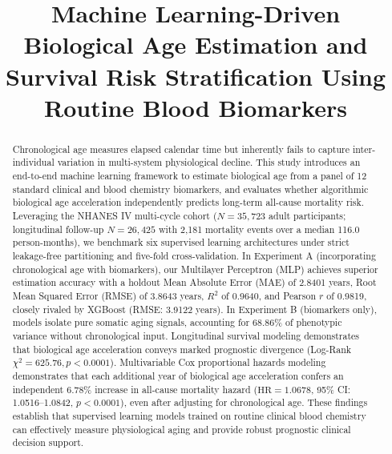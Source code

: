 \documentclass[conference]{IEEEtran}
\begin{document}
\title{Machine Learning-Driven Biological Age Estimation and Survival Risk Stratification Using Routine Blood Biomarkers}

\author{
}

\maketitle

\begin{abstract}
Chronological age measures elapsed calendar time but inherently fails to capture inter-individual variation in multi-system physiological decline. This study introduces an end-to-end machine learning framework to estimate biological age from a panel of 12 standard clinical and blood chemistry biomarkers, and evaluates whether algorithmic biological age acceleration independently predicts long-term all-cause mortality risk. Leveraging the NHANES IV multi-cycle cohort ($N = 35,723$ adult participants; longitudinal follow-up $N = 26,425$ with 2,181 mortality events over a median 116.0 person-months), we benchmark six supervised learning architectures under strict leakage-free partitioning and five-fold cross-validation. In Experiment A (incorporating chronological age with biomarkers), our Multilayer Perceptron (MLP) achieves superior estimation accuracy with a holdout Mean Absolute Error (MAE) of 2.8401 years, Root Mean Squared Error (RMSE) of 3.8643 years, $R^2$ of 0.9640, and Pearson $r$ of 0.9819, closely rivaled by XGBoost (RMSE: 3.9122 years). In Experiment B (biomarkers only), models isolate pure somatic aging signals, accounting for 68.86\% of phenotypic variance without chronological input. Longitudinal survival modeling demonstrates that biological age acceleration conveys marked prognostic divergence (Log-Rank $\chi^2 = 625.76, p < 0.0001$). Multivariable Cox proportional hazards modeling demonstrates that each additional year of biological age acceleration confers an independent 6.78\% increase in all-cause mortality hazard ($\text{HR} = 1.0678$, 95\% CI: 1.0516--1.0842, $p < 0.0001$), even after adjusting for chronological age. These findings establish that supervised learning models trained on routine clinical blood chemistry can effectively measure physiological aging and provide robust prognostic clinical decision support.
\end{abstract}
\end{document}
